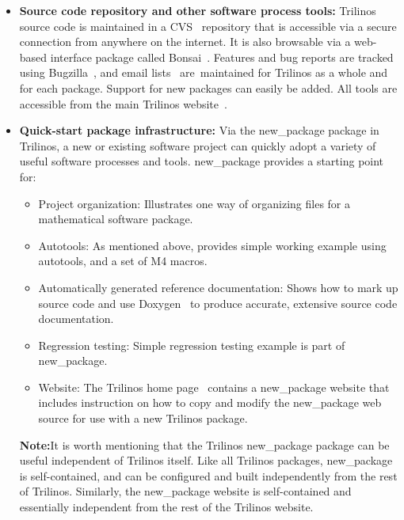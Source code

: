 \documentclass[acmtoms,acmnow]{acmtrans2m}
\begin{document}
\begin{itemize}
\item {\bf Source code repository and other software process tools:}
Trilinos source code is
maintained in a CVS~\cite{CVS} repository that is accessible via a
secure connection from anywhere on the internet.  It is also browsable
via a web-based interface package called Bonsai~\cite{Bonsai}.  Features 
and bug reports are tracked using Bugzilla~\cite{Bugzilla}, and email 
lists~\cite{Mailman} are\
maintained for Trilinos as a whole and for each package.  Support for new
packages can easily be added.  All tools are accessible from the main
Trilinos website~\cite{Trilinos-home-page}.

\item {\bf Quick-start package infrastructure:} Via the new\_package package in
Trilinos, a new or existing software project can quickly adopt a
variety of useful software processes and tools.  new\_package provides a
starting point for:
\begin{itemize}
\item Project organization:  Illustrates one way of
organizing files for a mathematical software package.
\item Autotools: As mentioned above, provides simple working example
using autotools, and a set of M4 macros.
\item Automatically generated reference documentation: Shows how
to mark up source code and use Doxygen~\cite{Doxygen} to produce
accurate, extensive source code documentation.
\item Regression testing: Simple regression testing example is part of
new\_package.
\item Website: The Trilinos home page~\cite{Trilinos-home-page}
contains a new\_package website that includes instruction on how to
copy and modify the new\_package web source for use with a new
Trilinos package.
\end{itemize}

{\bf Note:}It is worth mentioning that the Trilinos new\_package package can be
useful independent of Trilinos itself.  Like all Trilinos packages,
new\_package is self-contained, and can be configured and
built independently from the rest of Trilinos.  Similarly, the
new\_package website is self-contained and essentially independent
from the rest of the Trilinos website.
\end{itemize}
\end{document}
